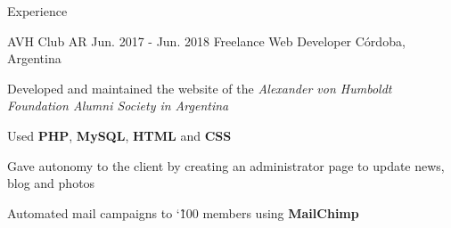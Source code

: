 \documentclass{curriculum}
\begin{document}
\begin{cvsection}{Experience}
\begin{sectionitemlist}
        \end{sectionitemlist}


    \makesectionitemheader
        {AVH Club AR}                                       {Jun. 2017 - Jun. 2018}
        {Freelance Web Developer}                              {Córdoba, Argentina}

        \begin{sectionitemlist}
        \item{
            Developed and maintained the website of the
            \textit{Alexander von Humboldt Foundation Alumni Society in Argentina}
        }
        \item{
            Used \textbf{PHP}, \textbf{MySQL}, \textbf{HTML} and \textbf{CSS}
        }
        \item{
            Gave autonomy to the client by creating
            an administrator page to update news, blog and photos
        }
        \item{
            Automated mail campaigns to  \char`\~ 100
            members using \textbf{MailChimp}
        }
        \end{sectionitemlist}

\end{cvsection}

\end{document}
